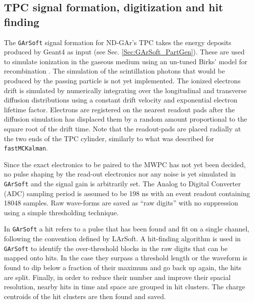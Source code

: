 \subsection{TPC signal formation, digitization and hit finding}
\label{GArSoft_signal}
The \texttt{GArSoft} signal formation for ND-GAr's TPC takes the energy deposits produced by Geant4 as input (see Sec. \ref{Sec:GArSoft_PartGen}). These are used to simulate ionization in the gaseous medium using an un-tuned Birks' model for recombination \cite{Birks:1951boa}. The simulation of the scintillation photons that would be produced by the passing particle is not yet implemented. The ionized electrons drift is simulated by numerically integrating over the longitudinal and transverse diffusion distributions using a constant drift velocity and exponential electron lifetime factor. Electrons are registered on the nearest readout pads after the diffusion simulation has displaced them by a random
amount proportional to the square root of the drift time. Note that the readout-pads are placed radially at the two ends of the TPC cylinder, similarly to what was described for \texttt{fastMCKalman}. 

Since the exact electronics to be paired to the MWPC has not yet been decided, no pulse shaping by the read-out electronics nor any noise is yet simulated in \texttt{GArSoft} and the signal gain is arbitrarily set. The Analog to Digital Converter (ADC) sampling period is assumed to be 198 ns with an event readout containing 18048 samples. Raw wave-forms are saved as \enquote{raw digits} with no suppression using a simple thresholding technique.

In \texttt{GArSoft} a hit refers to a pulse that has been found and fit on a single channel, following the convention defined by LArSoft. A hit-finding algorithm is used in \texttt{GArSoft} to identify the over-threshold blocks in the raw digits that can be mapped onto hits. In the case they surpass a threshold length or the waveform is found to dip below a fraction of their maximum and go back up again, the hits are split. Finally, in order to reduce their number and improve their spacial resolution, nearby hits in time and space are grouped in hit clusters. The charge centroids of the hit clusters are then found and saved. 

